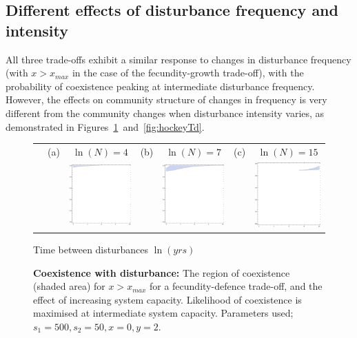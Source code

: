 \documentclass[a4paper]{article}
\begin{document}
\subsection{Different effects of disturbance frequency and intensity}
All three trade-offs exhibit a similar response to changes in disturbance frequency (with $x>x_{max}$ in the case of the fecundity-growth trade-off), with the probability of coexistence peaking at intermediate disturbance frequency. However, the effects on community structure of changes in frequency is very different from the community changes when disturbance intensity varies, as demonstrated in Figures~\ref{fig:FvIwithN}~and~\ref{fig:hockeyTd}. 
\begin{figure}[th]
\centering
\begin{tabular}{lcccccc}
 &(a)&$\ln(N)=4$&(b)&$\ln(N)=7$&(c)&$\ln(N)=15$\\
 && \includegraphics[width=1.5in]{fdtoimageexp4.pdf} && \includegraphics[width=1.5in]{fdtoimageexp7.pdf} && \includegraphics[width=1.5in]{fdtoimageexp15.pdf}
 \end{tabular}
 Time between disturbances $\ln(yrs)$
   \caption{\textbf{Coexistence with disturbance: }The region of coexistence (shaded area) for $x>x_{max}$ for a fecundity-defence trade-off, and the effect of increasing system capacity. Likelihood of coexistence is maximised at intermediate system capacity. Parameters used;  $s_1=500,s_2=50,x=0,y=2$.}
 \label{fig:FvIwithN}
\end{figure}
\end{document}
